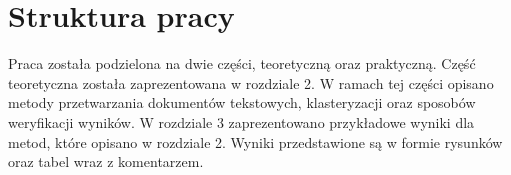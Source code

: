\section{Struktura pracy}

Praca została podzielona na dwie części, teoretyczną oraz praktyczną. Część teoretyczna została zaprezentowana w rozdziale 2. W ramach tej części opisano metody przetwarzania dokumentów tekstowych, klasteryzacji oraz sposobów weryfikacji wyników. W rozdziale 3 zaprezentowano przykładowe wyniki dla metod, które opisano w rozdziale 2. Wyniki przedstawione są w formie rysunków oraz tabel wraz z komentarzem.